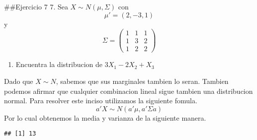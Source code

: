 \documentclass[]{article}
\newenvironment{Shaded}{\begin{snugshade}}{\end{snugshade}}
\newcommand{\DataTypeTok}[1]{\textcolor[rgb]{0.13,0.29,0.53}{#1}}
\newcommand{\DecValTok}[1]{\textcolor[rgb]{0.00,0.00,0.81}{#1}}
\newcommand{\FloatTok}[1]{\textcolor[rgb]{0.00,0.00,0.81}{#1}}
\newcommand{\KeywordTok}[1]{\textcolor[rgb]{0.13,0.29,0.53}{\textbf{#1}}}
\newcommand{\NormalTok}[1]{#1}
\newcommand{\OperatorTok}[1]{\textcolor[rgb]{0.81,0.36,0.00}{\textbf{#1}}}
\newcommand{\OtherTok}[1]{\textcolor[rgb]{0.56,0.35,0.01}{#1}}
\newcommand{\StringTok}[1]{\textcolor[rgb]{0.31,0.60,0.02}{#1}}
\providecommand{\tightlist}{%
  \setlength{\itemsep}{0pt}\setlength{\parskip}{0pt}}
\begin{document}
\#\#Ejercicio 7 7. Sea \(X \sim N(\mu,\Sigma)\) con \[\mu' = (2,-3,1)\]
y \[\Sigma = \left(\begin{array}{cc} 
1 & 1 & 1\\
1 & 3 & 2 \\
1 & 2 & 2
\end{array}\right)\]

\begin{enumerate}
\def\labelenumi{\alph{enumi})}
\tightlist
\item
  Encuentra la distribucion de \(3X_1 - 2X_2 + X_3\)
\end{enumerate}

Dado que \(X \sim N\), sabemos que sus marginales tambien lo seran.
Tambien podemos afirmar que cualquier combinacion lineal sigue tambien
una distribucion normal. Para resolver este inciso utilizamos la
siguiente fomula. \[ a'X \sim N(a'\mu, a'\Sigma a)\] Por lo cual
obtenemos la media y varianza de la siguiente manera.

\begin{Shaded}
\end{Shaded}

\begin{verbatim}
## [1] 13
\end{verbatim}

\begin{Shaded}
\end{Shaded}
\end{document}
